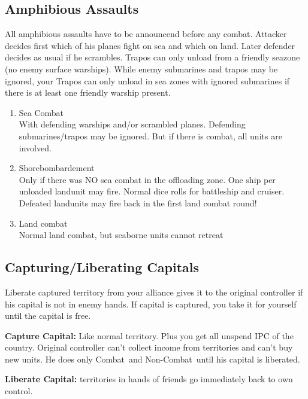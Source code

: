\documentclass[10pt,twoside]{article}
\begin{document}
\begin{multicols*}{3}
\subsection*{Amphibious Assaults}
All amphibious assaults have to be announcend before any combat. Attacker decides first which of his planes fight on sea and which on land. Later defender decides as usual if he scrambles. Trapos can only unload from a friendly seazone (no enemy surface warships). While enemy submarines and trapos may be ignored, your Trapos can only unload in sea zones with ignored submarines if there is at least one friendly warship present.
\begin{enumerate}
\item Sea Combat\\
With defending warships and/or scrambled planes. Defending submarines/trapos may be ignored. But if there is combat, all units are involved.
\item Shorebombardement\\
Only if there was NO sea combat in the offloading zone.  One ship per unloaded landunit may fire. Normal dice rolls for battleship and cruiser. Defeated landunits may fire back in the first land combat round!
\item Land combat\\
Normal land combat, but seaborne units cannot retreat
\end{enumerate}

\subsection*{Capturing/Liberating Capitals}
Liberate captured territory from your alliance gives it to the original controller if his capital is not in enemy hands. If capital is captured, you take it for yourself until the capital is free.

\textbf{Capture Capital:} Like normal territory. Plus you get all unspend IPC of the country. Original controller can't collect income from territories and can't buy new units. He does only \glqq Combat\grqq\ and \glqq Non-Combat\grqq\ until his capital is liberated.

\textbf{Liberate Capital:} territories in hands of friends go immediately back to own control.


\end{multicols*}
\end{document}
